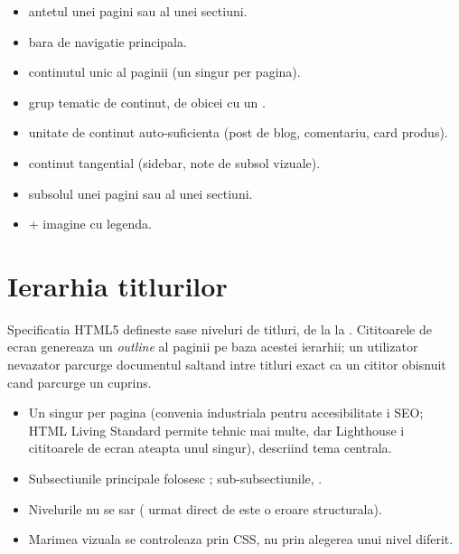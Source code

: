 \begin{itemize}[itemsep=2pt]
  \item {} \textendash{} antetul unei pagini sau al unei sectiuni.
  \item {} \textendash{} bara de navigatie principala.
  \item {} \textendash{} continutul unic al paginii (un singur  per pagina).
  \item {} \textendash{} grup tematic de continut, de obicei cu un .
  \item {} \textendash{} unitate de continut auto-suficienta (post de blog, comentariu, card produs).
  \item {} \textendash{} continut tangential (sidebar, note de subsol vizuale).
  \item {} \textendash{} subsolul unei pagini sau al unei sectiuni.
  \item {} +  \textendash{} imagine cu legenda.
\end{itemize}

\section{Ierarhia titlurilor}

Specificatia HTML5 defineste sase niveluri de titluri, de la  la . Cititoarele de ecran genereaza un \emph{outline} al paginii pe baza acestei ierarhii; un utilizator nevazator parcurge documentul saltand intre titluri exact ca un cititor obisnuit cand parcurge un cuprins.

\begin{itemize}
  \item Un singur  per pagina (convenia industriala pentru accesibilitate i SEO; HTML Living Standard permite tehnic mai multe, dar Lighthouse i cititoarele de ecran ateapta unul singur), descriind tema centrala.
  \item Subsectiunile principale folosesc ; sub-subsectiunile, .
  \item Nivelurile nu se sar ( urmat direct de  este o eroare structurala).
  \item Marimea vizuala se controleaza prin CSS, nu prin alegerea unui nivel diferit.
\end{itemize}

